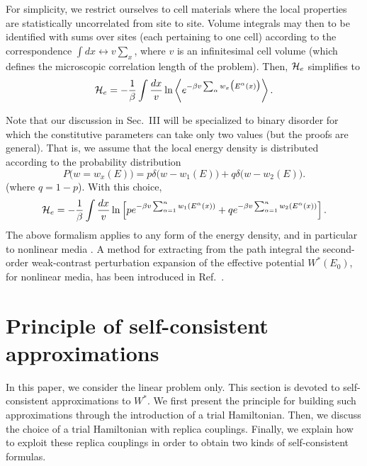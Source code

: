 For simplicity, we restrict ourselves to cell materials where the local
properties are statistically uncorrelated from site to site. Volume
integrals may then to be identified with sums over sites (each
pertaining to one cell) according to the correspondence $\int
dx\leftrightarrow v\sum_x$, where $v$ is an infinitesimal cell volume
(which defines the microscopic correlation length of the
problem). Then, ${\cal{H}}_e$ simplifies to
\begin{equation}
\label{calf}
{\cal{H}}_e=-{1\over\beta}\int\frac{dx}{v} \ln\left\langle
e^{-\beta v\sum_\alpha w_x\bigl(E^\alpha(x)\bigr)}\right\rangle.
\end{equation}

Note that our discussion in Sec.\ III will be specialized to binary
disorder for which the constitutive parameters can take only two
values (but the proofs are general). That is, we assume that the
local energy density is distributed according to the probability
distribution
\begin{equation}
P\bigl(w=w_x(E)\bigr)=p\delta \bigl(w-w_1(E)\bigr)+
q\delta \bigl(w-w_2(E)\bigr).
\end{equation}
(where $q=1-p$). With this choice,
\begin{equation}
\label{znmoyen}
{\cal{H}}_e=-{1\over\beta}\int\frac{dx}{v} \ln
\left[p e^{-\beta v\sum_{\alpha=1}^n w_1\left(E^{\alpha}(x)\right)} +qe^{-\beta v \sum_{\alpha=1}^n w_2\left(E^{\alpha}(x)\right)}\right].
\end{equation}
The above formalism applies to any form of the energy density, and in
particular to nonlinear media \cite{BERG92,PONT92a,YU94,PONT97}.
A method for extracting from the path integral the second-order
weak-contrast perturbation expansion of the effective potential
$W^*(E_0)$, for nonlinear media, has been introduced in Ref.\ \cite{BART98}.

\section{Principle of self-consistent approximations}
\label{posa}
In this paper, we consider the linear problem only. This section is devoted to self-consistent approximations to $W^*$. We first present
the principle for building such approximations through the
introduction of a trial Hamiltonian. Then, we
discuss the choice of a trial Hamiltonian with replica couplings.
Finally, we explain how to exploit these replica couplings
in order to obtain two kinds of self-consistent formulas.

